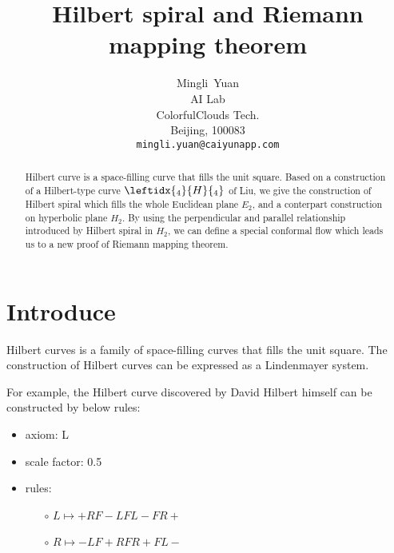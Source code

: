 \documentclass{article}
\title{Hilbert spiral and Riemann mapping theorem}
\author{
  Mingli~Yuan \\
  AI Lab \\
  ColorfulClouds Tech.\\
  Beijing, 100083 \\
  \texttt{mingli.yuan@caiyunapp.com} \\
}
\begin{document}
\maketitle

\begin{abstract}
    Hilbert curve is a space-filling curve that fills the unit square.
    Based on a construction of a Hilbert-type curve $\leftidx{_4}{H}{_4}$ of Liu,
    we give the construction of Hilbert spiral which fills the whole Euclidean plane $E_2$,
    and a conterpart construction on hyperbolic plane $H_2$.
    By using the perpendicular and parallel relationship introduced by Hilbert spiral in $H_2$,
    we can define a special conformal flow which leads us to a new proof of Riemann mapping theorem.
\end{abstract}


\setcounter{tocdepth}{2}
\tableofcontents

\section{Introduce}\label{sec:intro}

Hilbert curves is a family of space-filling curves that fills the unit square. The construction of Hilbert curves can be
expressed as a Lindenmayer system.

For example, the Hilbert curve discovered by David Hilbert himself can be constructed by below rules:

\begin{itemize}
  \item axiom: L
  \item scale factor: 0.5
  \item rules: \begin{itemize}
      \item[$\circ$] $L \mapsto +RF-LFL-FR+ $
      \item[$\circ$] $R \mapsto -LF+RFR+FL- $
  \end{itemize}
\end{itemize}

\end{document}
